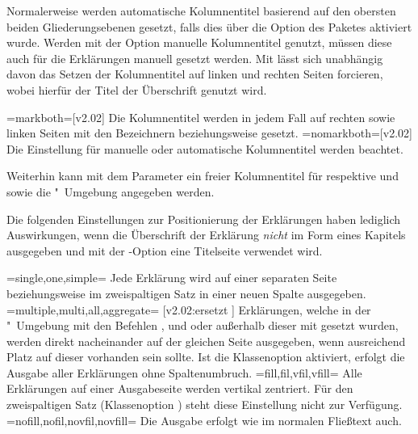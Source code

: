 \begin{DeclareEntity*}{}
\begin{DeclareEntity*}{}
\begin{DeclareEntity*}{}
\begin{Declaration}
Normalerweise werden automatische Kolumnentitel basierend auf den obersten 
beiden Gliederungsebenen gesetzt, falls dies über die Option  
des Paketes  aktiviert wurde. Werden mit der Option 
 manuelle Kolumnentitel genutzt, müssen diese auch für die 
Erklärungen manuell gesetzt werden. Mit  lässt 
sich unabhängig davon das Setzen der Kolumnentitel auf linken und rechten 
Seiten forcieren, wobei hierfür der Titel der Überschrift genutzt wird.
\begin{DeclareValues}
\itemval=markboth=[v2.02]
  Die Kolumnentitel werden in jedem Fall auf rechten sowie linken Seiten mit 
  den Bezeichnern  beziehungsweise  
  gesetzt.
\itemval=nomarkboth=[v2.02]
  Die Einstellung für manuelle oder automatische Kolumnentitel werden beachtet.
\end{DeclareValues}

Weiterhin kann mit dem Parameter  ein 
freier Kolumnentitel für  respektive  
und  sowie die "~Umgebung angegeben 
werden.

Die folgenden Einstellungen zur Positionierung der Erklärungen haben lediglich 
Auswirkungen, wenn die Überschrift der Erklärung \emph{nicht} im Form eines 
Kapitels ausgegeben und mit der \KOMAScript-Option  eine 
Titelseite verwendet wird.
\begin{DeclareValues}
\itemval=single,one,simple=
  Jede Erklärung wird auf einer separaten Seite
  beziehungsweise im zweispaltigen Satz in einer neuen Spalte ausgegeben.
\itemval=multiple,multi,all,aggregate=%
    [v2.02:ersetzt ]
  Erklärungen, welche in der "~Umgebung mit den 
  Befehlen ,  und  oder 
  außerhalb dieser mit  gesetzt wurden, werden direkt 
  nacheinander auf der gleichen Seite ausgegeben, wenn ausreichend Platz auf 
  dieser vorhanden sein sollte. Ist die Klassenoption  
  aktiviert, erfolgt die Ausgabe aller Erklärungen ohne Spaltenumbruch.
\itemval=fill,fil,vfil,vfill=
  Alle Erklärungen auf einer Ausgabeseite werden vertikal zentriert. Für 
  den zweispaltigen Satz (Klassenoption ) steht diese 
  Einstellung nicht zur Verfügung.
\itemval=nofill,nofil,novfil,novfill=
  Die Ausgabe erfolgt wie im normalen Fließtext auch.
\end{DeclareValues}
\end{Declaration}


\end{DeclareEntity*}
\end{DeclareEntity*}
\end{DeclareEntity*}
